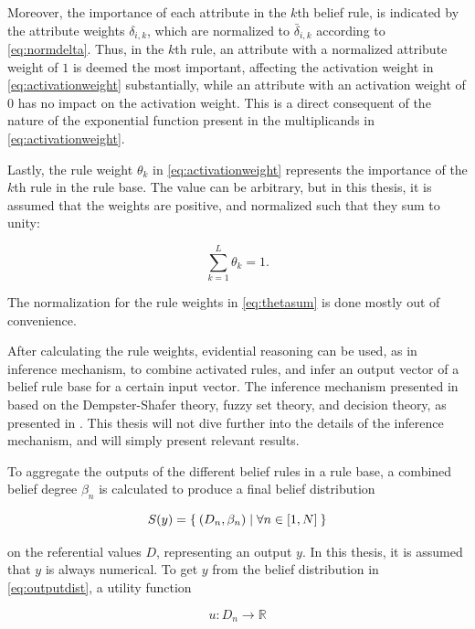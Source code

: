 Moreover, the importance of each attribute in the $k$th belief rule, is indicated by the attribute weights 
$\delta_{i, k}$, which are normalized 
to $\bar{\delta}_{i, k}$ according to \eqref{eq:normdelta}. Thus, in the $k$th rule, an attribute with a normalized attribute
weight of $1$ is deemed the most
important, affecting the activation weight in \eqref{eq:activationweight} substantially, while
an attribute with an activation weight of $0$ has no impact on the activation weight. This is a direct consequent of the nature of the
exponential function present in the multiplicands in \eqref{eq:activationweight}.

Lastly, the rule weight $\theta_k$ in \eqref{eq:activationweight} represents the importance of the $k$th rule
in the rule base. The value can be arbitrary, but in this thesis, it is assumed that the weights are positive, and normalized such that
they sum to unity:

\begin{equation}
    \label{eq:thetasum}
    \sum_{k=1}^L \theta_k = 1.
\end{equation}

The normalization for the rule weights in \eqref{eq:thetasum} is done mostly out of convenience.

After calculating the rule weights, evidential reasoning can be used, as in inference mechanism,
to combine activated rules, and infer an output vector of a belief rule base for a certain input
vector. The inference mechanism presented in based on the Dempster-Shafer theory, fuzzy set theory, and
decision theory, as presented in \cite{Chen2011}. This thesis will not dive further into the details
of the inference mechanism, and will simply present relevant results.

To aggregate the outputs of the different belief rules in a rule base, a combined belief degree
$\beta_n$ is calculated to produce a final belief distribution

\begin{equation}
    \label{eq:outputdist}
    S(y) = \Set{\left(D_n, \beta_n \right) \mid \forall n \in \left[1, N \right]}
\end{equation}

on the referential values $D$, representing an output $y$. In this thesis, it is assumed that $y$
is always numerical. To get $y$ from the belief distribution in \eqref{eq:outputdist}, a utility
function

\begin{equation}
    \label{eq:outpututility}
    u: D_n \to \mathbb{R}
\end{equation}

